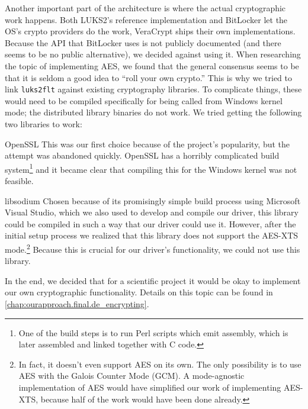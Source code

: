 
Another important part of the architecture is where the actual cryptographic work happens. Both LUKS2's reference implementation and BitLocker let the OS's crypto providers do the work, VeraCrypt ships their own implementations. Because the API that BitLocker uses is not publicly documented (and there seems to be no public alternative), we decided against using it. When researching the topic of implementing AES, we found that the general consensus seems to be that it is seldom a good idea to ``roll your own crypto.'' This is why we tried to link \texttt{luks2flt} against existing cryptography libraries. To complicate things, these would need to be compiled specifically for being called from Windows kernel mode; the distributed library binaries do not work. We tried getting the following two libraries to work:
\begin{descitemize}
	\item[OpenSSL] This was our first choice because of the project's popularity, but the attempt was abandoned quickly. OpenSSL has a horribly complicated build system\footnote{\label{fn:ourapproach.final.opensslbuild} One of the build steps is to run Perl scripts which emit assembly, which is later assembled and linked together with C code.} and it became clear that compiling this for the Windows kernel was not feasible.
	\item[libsodium] Chosen because of its promisingly simple build process using Microsoft Visual Studio, which we also used to develop and compile our driver, this library could be compiled in such a way that our driver could use it. However, after the initial setup process we realized that this library does not support the AES-XTS mode.\footnote{\label{fn:ourapproach.final.libsodium} In fact, it doesn't even support AES on its own. The only possibility is to use AES with the Galois Counter Mode (GCM). A mode-agnostic implementation of AES would have simplified our work of implementing AES-XTS, because half of the work would have been done already.} Because this is crucial for our driver's functionality, we could not use this library.
\end{descitemize}

In the end, we decided that for a scientific project it would be okay to implement our own cryptographic functionality. Details on this topic can be found in \autoref{chap:ourapproach.final.de_encrypting}.

